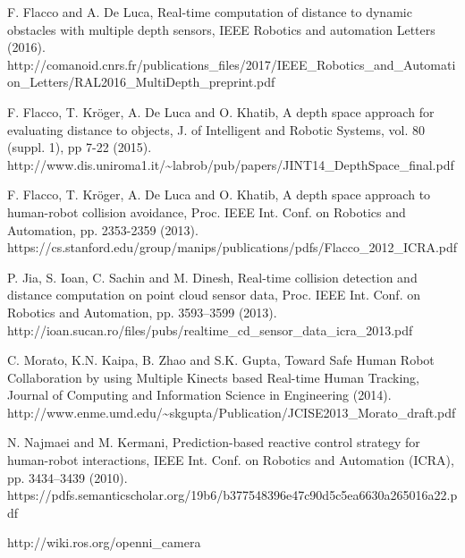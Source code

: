 \documentclass[smallextended]{svjour3}
\begin{document}

%
%
\begin{thebibliography}{}

F. Flacco and A. De Luca, Real-time computation of distance to dynamic obstacles with multiple depth sensors, IEEE Robotics and automation Letters (2016).
http://comanoid.cnrs.fr/publications\_files/2017/IEEE\_Robotics\_and\_Automation\_Letters/RAL2016\_MultiDepth\_preprint.pdf

F. Flacco, T. Kröger, A. De Luca and O. Khatib, A depth space approach for evaluating distance to objects, J. of Intelligent and Robotic Systems, vol. 80 (suppl. 1), pp 7-22 (2015).
http://www.dis.uniroma1.it/\textasciitilde labrob/pub/papers/JINT14\_DepthSpace\_final.pdf

F. Flacco, T. Kröger, A. De Luca and O. Khatib, A depth space approach to human-robot collision avoidance, Proc. IEEE Int. Conf. on Robotics and Automation, pp. 2353-2359 (2013).
https://cs.stanford.edu/group/manips/publications/pdfs/Flacco\_2012\_ICRA.pdf


P. Jia, S. Ioan, C. Sachin and M. Dinesh, Real-time collision detection and  distance computation  on  point  cloud  sensor data, Proc.  IEEE Int. Conf. on Robotics and Automation, pp. 3593–3599 (2013).
http://ioan.sucan.ro/files/pubs/realtime\_cd\_sensor\_data\_icra\_2013.pdf

C. Morato, K.N. Kaipa, B. Zhao and S.K. Gupta, Toward Safe Human Robot Collaboration by using Multiple Kinects based Real-time Human Tracking, Journal of Computing and Information Science in Engineering (2014).
http://www.enme.umd.edu/\textasciitilde skgupta/Publication/JCISE2013\_Morato\_draft.pdf

N. Najmaei and M. Kermani, Prediction-based reactive control strategy for human-robot interactions, IEEE Int. Conf. on Robotics and Automation (ICRA), pp. 3434–3439 (2010).
https://pdfs.semanticscholar.org/19b6/b377548396e47c90d5c5ea6630a265016a22.pdf

http://wiki.ros.org/openni\_camera

\end{thebibliography}
\end{document}

